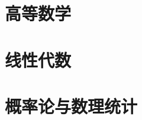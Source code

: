 \documentclass{book}
\title{\documentTitle}
\author{\documentAuthor}
\date{\today}
\begin{document}
	\maketitle
	\setcounter{secnumdepth}{4}
	\tableofcontents

	\part{高等数学}

	
	\part{线性代数}
%	
%	
%	
%	
%	
%	
	
	\part{概率论与数理统计}
%	
%	
%	
%	
%	
%	
%	
%	
%	
\end{document}
